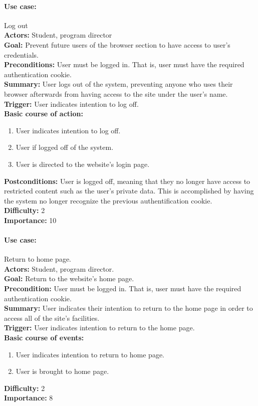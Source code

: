 \documentclass[12pt]{article}
\begin{document}
\paragraph*{Use case:} Log out \\
\textbf{Actors:} Student, program director\\
\textbf{Goal:} Prevent future users of the browser section to have access to user's credentials.\\
\textbf{Preconditions:} User must be logged in. That is, user must have the required authentication cookie.\\
\textbf{Summary:} User logs out of the system, preventing anyone who uses their browser afterwards from having access to the site under the user's name.\\
\textbf{Trigger:} User indicates intention to log off.\\
\textbf{Basic course of action:}
\begin{enumerate}
\item User indicates intention to log off.
\item User if logged off of the system.
\item User is directed to the website's login page.
\end{enumerate}
\textbf{Postconditions:} User is logged off, meaning that they no longer have access to restricted content such as the user's private data. This is accomplished by having the system no longer recognize the previous authentification cookie.\\
\textbf{Difficulty:} 2\\
\textbf{Importance:} 10\\


\paragraph*{Use case:} Return to home page.\\
\textbf{Actors:} Student, program director.\\
\textbf{Goal:} Return to the website's home page.\\
\textbf{Precondition:} User must be logged in. That is, user must have the required authentication cookie.\\
\textbf{Summary:} User indicates their intention to return to the home page in order to access all of the site's facilities.\\
\textbf{Trigger:} User indicates intention to return to the home page.\\
\textbf{Basic course of events:}
\begin{enumerate}
\item User indicates intention to return to home page.
\item User is brought to home page.
\end{enumerate}
\textbf{Difficulty:} 2\\
\textbf{Importance:} 8\\
\end{document}
